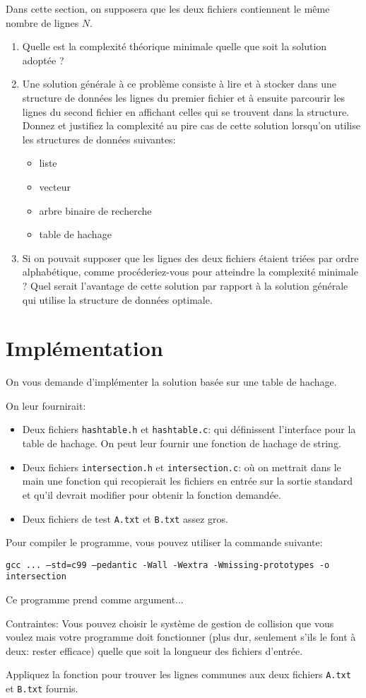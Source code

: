 \documentclass[a4paper,10pt]{article}
\begin{document}
Dans cette section, on supposera que les deux fichiers contiennent le même nombre de lignes $N$.
\begin{enumerate}
\item Quelle est la complexité théorique minimale quelle que soit la solution adoptée ?
\item Une solution générale à ce problème consiste à lire et à stocker
  dans une structure de données les lignes du premier fichier et à
  ensuite parcourir les lignes du second fichier en affichant celles qui
  se trouvent dans la structure. Donnez et justifiez la complexité au pire cas de cette solution
  lorsqu'on utilise les structures de données suivantes:
\begin{itemize}
\item liste
\item vecteur
\item arbre binaire de recherche
\item table de hachage
\end{itemize}
\item Si on pouvait supposer que les lignes des deux fichiers étaient
  triées par ordre alphabétique, comme procéderiez-vous pour atteindre
  la complexité minimale ? Quel serait l'avantage de cette solution
  par rapport à la solution générale qui utilise la structure de
  données optimale.
\end{enumerate}

\section{Implémentation}

On vous demande d'implémenter la solution basée sur une table de
hachage.

On leur fournirait:
\begin{itemize}
\item Deux fichiers \texttt{hashtable.h} et \texttt{hashtable.c}: qui définissent l'interface pour la table de hachage. On peut leur fournir une fonction de hachage de string.
\item Deux fichiers \texttt{intersection.h} et \texttt{intersection.c}: où on mettrait
  dans le main une fonction qui recopierait les fichiers en entrée sur
  la sortie standard et qu'il devrait modifier pour obtenir la
  fonction demandée.
\item Deux fichiers de test \texttt{A.txt} et \texttt{B.txt} assez gros.
\end{itemize}

Pour compiler le programme, vous pouvez utiliser la commande suivante:

{\small \texttt{gcc ... --std=c99 --pedantic -Wall -Wextra -Wmissing-prototypes -o intersection}}

Ce programme prend comme argument...

Contraintes: Vous pouvez choisir le système de gestion de collision
que vous voulez mais votre programme doit fonctionner (plus dur, seulement s'ils
le font à deux: rester efficace) quelle que soit la longueur des
fichiers d'entrée.

Appliquez la fonction pour trouver les lignes communes aux deux fichiers \texttt{A.txt} et \texttt{B.txt} fournis.
\end{document}
